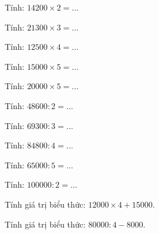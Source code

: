 \begin{ex}
Tính: $14200 \times 2 = \dots$
\end{ex}

\begin{ex}
Tính: $21300 \times 3 = \dots$
\end{ex}

\begin{ex}
Tính: $12500 \times 4 = \dots$
\end{ex}

\begin{ex}
Tính: $15000 \times 5 = \dots$
\end{ex}

\begin{ex}
Tính: $20000 \times 5 = \dots$
\end{ex}

\begin{ex}
Tính: $48600 : 2 = \dots$
\end{ex}

\begin{ex}
Tính: $69300 : 3 = \dots$
\end{ex}

\begin{ex}
Tính: $84800 : 4 = \dots$
\end{ex}

\begin{ex}
Tính: $65000 : 5 = \dots$
\end{ex}

\begin{ex}
Tính: $100000 : 2 = \dots$
\end{ex}

\begin{ex}
Tính giá trị biểu thức: $12000 \times 4 + 15000$.
\end{ex}

\begin{ex}
Tính giá trị biểu thức: $80000 : 4 - 8000$.
\end{ex}

